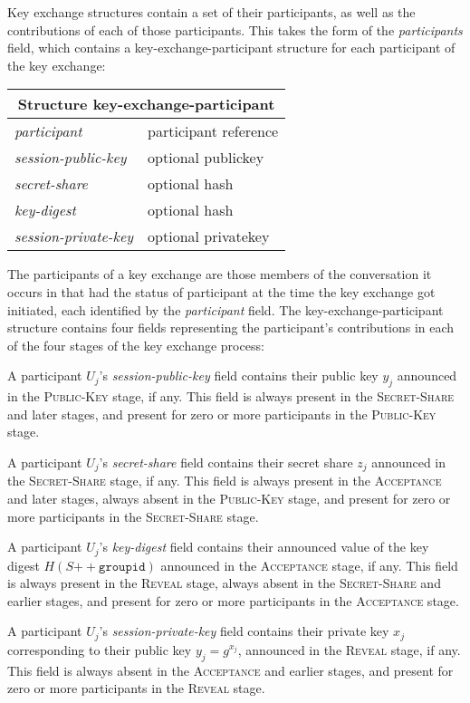 \documentclass{article}
\def\smfield#1{\textsl{#1}}
\def\type#1{\textsf{#1}}
\def\concat{\mathbin{+\!\!\!+}}
\newenvironment{struct}[1]{
\newcommand{\structfield}[2]{
\smfield{##1} & \type{##2} \\
\hline
}
\par
\vspace{-\medskipamount}
\hspace{2em minus 2em}\begin{tabular}{|l|l|}
\hline
\multicolumn{2}{|c|}{Structure \type{#1}} \\
\hline
\hline
}{
\end{tabular}
\vspace{-\medskipamount}
\par
}
\begin{document}
Key exchange structures contain a set of their participants, as well as the contributions of each of those participants.
This takes the form of the \smfield{participants} field, which contains a \type{key-exchange-participant} structure for each participant of the key exchange:
\begin{struct}{key-exchange-participant}
\structfield{participant}{participant reference}
\structfield{session-public-key}{optional publickey}
\structfield{secret-share}{optional hash}
\structfield{key-digest}{optional hash}
\structfield{session-private-key}{optional privatekey}
\end{struct}
The participants of a key exchange are those members of the conversation it occurs in that had the status of participant at the time the key exchange got initiated, each identified by the \smfield{participant} field.
The \type{key-exchange-participant} structure contains four fields representing the participant's contributions in each of the four stages of the key exchange process:
\begin{description}[noitemsep]
\item[\normalfont \smfield{session-public-key}.] A participant $U_j$'s \smfield{session-public-key} field contains their public key $y_j$ announced in the \textsc{Public-Key} stage, if any. This field is always present in the \textsc{Secret-Share} and later stages, and present for zero or more participants in the \textsc{Public-Key} stage.
\item[\normalfont \smfield{secret-share}.] A participant $U_j$'s \smfield{secret-share} field contains their secret share $z_j$ announced in the \textsc{Secret-Share} stage, if any. This field is always present in the \textsc{Acceptance} and later stages, always absent in the \textsc{Public-Key} stage, and present for zero or more participants in the \textsc{Secret-Share} stage.
\item[\normalfont \smfield{key-digest}.] A participant $U_j$'s \smfield{key-digest} field contains their announced value of the key digest $H(S \concat \texttt{groupid})$ announced in the \textsc{Acceptance} stage, if any. This field is always present in the \textsc{Reveal} stage, always absent in the \textsc{Secret-Share} and earlier stages, and present for zero or more participants in the \textsc{Acceptance} stage.
\item[\normalfont \smfield{session-private-key}.] A participant $U_j$'s \smfield{session-private-key} field contains their private key $x_j$ corresponding to their public key $y_j = g^{x_j}$, announced in the \textsc{Reveal} stage, if any. This field is always absent in the \textsc{Acceptance} and earlier stages, and present for zero or more participants in the \textsc{Reveal} stage.
\end{description}
\end{document}
